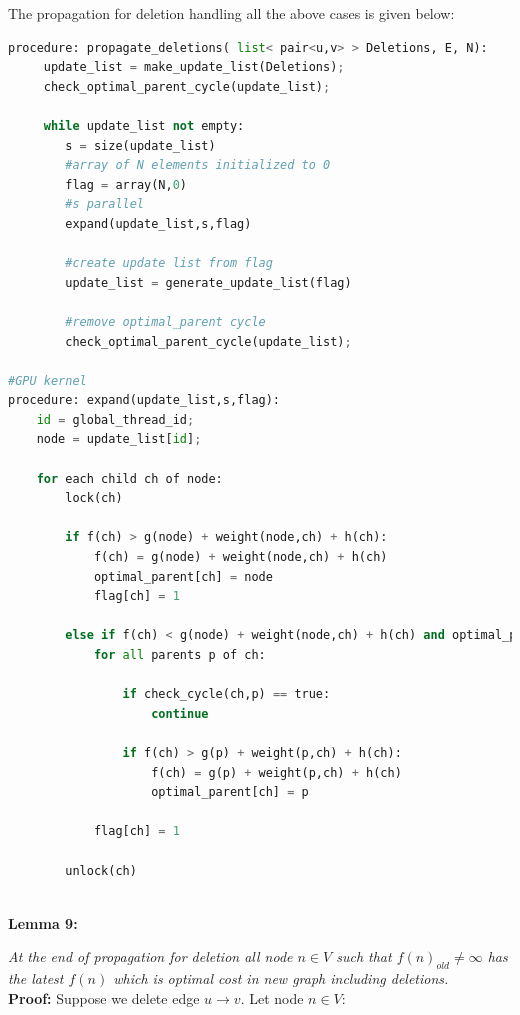 \documentclass[a4paper]{article}
\begin{document}

The propagation for deletion handling all the above cases is given below:
\begin{lstlisting}[language=python, caption=Propagation of Deletions]
procedure: propagate_deletions( list< pair<u,v> > Deletions, E, N):
     update_list = make_update_list(Deletions);
     check_optimal_parent_cycle(update_list);
     
     while update_list not empty:
        s = size(update_list)
        #array of N elements initialized to 0
        flag = array(N,0)
        #s parallel
        expand(update_list,s,flag)
        
        #create update list from flag
        update_list = generate_update_list(flag)
        
        #remove optimal_parent cycle 
        check_optimal_parent_cycle(update_list);

#GPU kernel
procedure: expand(update_list,s,flag):
    id = global_thread_id;
    node = update_list[id];
    
    for each child ch of node:
        lock(ch)
        
        if f(ch) > g(node) + weight(node,ch) + h(ch):
            f(ch) = g(node) + weight(node,ch) + h(ch)  
            optimal_parent[ch] = node
            flag[ch] = 1
        
        else if f(ch) < g(node) + weight(node,ch) + h(ch) and optimal_parent[ch] == node:
            for all parents p of ch:
            
                if check_cycle(ch,p) == true:
                    continue
            
                if f(ch) > g(p) + weight(p,ch) + h(ch):
                    f(ch) = g(p) + weight(p,ch) + h(ch)
                    optimal_parent[ch] = p
            
            flag[ch] = 1
        
        unlock(ch)
        
\end{lstlisting}
\hypertarget{Lemma 9}{\textbf{Lemma 9:}} \textit{At the end of propagation for deletion all node  $ n \in V$  such that $f(n)_{old} \neq \infty $ has the latest $f(n)$ which is optimal cost in new graph including deletions. }\\
\textbf{Proof:} Suppose we delete edge $u \rightarrow v$. Let node $n \in V$:\\
\end{document}
